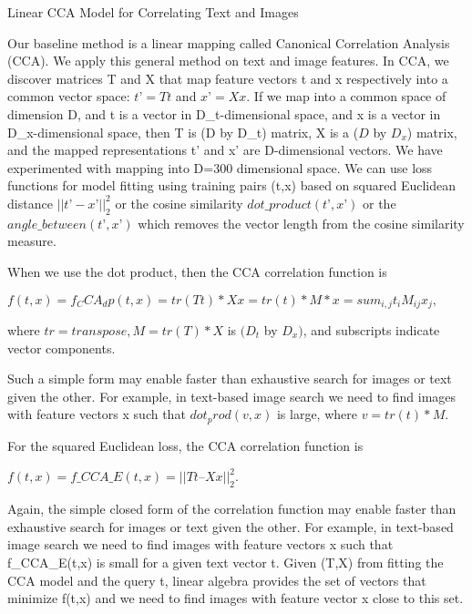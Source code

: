 \documentclass[runningheads]{llncs}
\begin{document}
Linear CCA Model for Correlating Text and Images

Our baseline method is a linear mapping called Canonical Correlation Analysis (CCA). We apply this general method on text and image features. In CCA, we discover matrices T and X that map feature vectors t and x respectively into a common vector space: $t’= Tt$ and $x’=Xx$. If we map into a common space of dimension D, and t is a vector in D\_t-dimensional space, and x is a vector in D\_x-dimensional space, then T is (D by D\_t) matrix, X is a ($D$ by $D_x$) matrix, and the mapped representations t’ and x’ are D-dimensional vectors. We have experimented with mapping into D=300 dimensional space. We can use loss functions for model fitting using training pairs (t,x) based on squared Euclidean distance $||t’-x’||_2^2$ or the cosine similarity $dot\_product(t’,x’)$ or the $angle\_between(t’,x’)$ which removes the vector length from the cosine similarity measure. 

When we use the dot product, then the CCA correlation function is

$f(t,x) = f_CCA_dp(t,x) = tr(Tt) * Xx = tr(t)*M*x = sum_{i,j} t_i M_{ij} x_j,$

where $tr=transpose, M=tr(T)*X$ is $(D_t$ by $D_x)$, and subscripts indicate vector components.

Such a simple form may enable faster than exhaustive search for images or text given the other. For example, in text-based image search we need to find images with feature vectors x such that $dot_prod(v,x)$ is large, where $v=tr(t)*M$.

For the squared Euclidean loss, the CCA correlation function is

$f(t,x) = f\_CCA\_E(t,x) = ||T t – X x||_2^2$.

Again, the simple closed form of the correlation function may enable faster than exhaustive search for images or text given the other. For example, in text-based image search we need to find images with feature vectors x such that f\_CCA\_E(t,x) is small for a given text vector t. Given (T,X) from fitting the CCA model and the query t, linear algebra provides the set of vectors that minimize f(t,x) and we need to find images with feature vector x close to this set.
\end{document}
